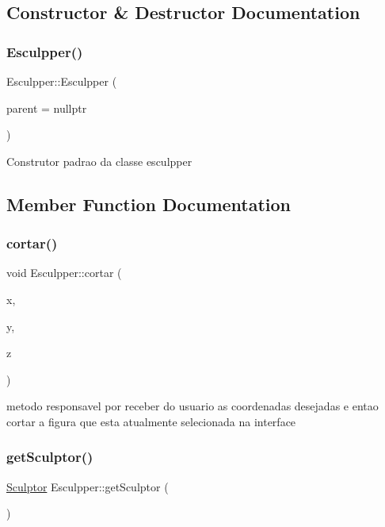 \subsection{Constructor \& Destructor Documentation}
\mbox{\label{class_esculpper_a89d2a33b5b2cebd4b06a938fed3c7d3b}} 
\subsubsection{\texorpdfstring{Esculpper()}{Esculpper()}}
{\footnotesize\ttfamily Esculpper\+::\+Esculpper (\begin{DoxyParamCaption}\item[{Q\+Widget $\ast$}]{parent = {\ttfamily nullptr} }\end{DoxyParamCaption})\hspace{0.3cm}{\ttfamily [explicit]}}

Construtor padrao da classe esculpper 

\subsection{Member Function Documentation}
\mbox{\label{class_esculpper_ae79b3da4d0b21385d56ca89b4584e802}} 
\subsubsection{\texorpdfstring{cortar()}{cortar()}}
{\footnotesize\ttfamily void Esculpper\+::cortar (\begin{DoxyParamCaption}\item[{int}]{x,  }\item[{int}]{y,  }\item[{int}]{z }\end{DoxyParamCaption})}

metodo responsavel por receber do usuario as coordenadas desejadas e entao cortar a figura que esta atualmente selecionada na interface \mbox{\label{class_esculpper_aa28642864781d77f35236e6504ab3ce0}} 
\subsubsection{\texorpdfstring{getSculptor()}{getSculptor()}}
{\footnotesize\ttfamily \mbox{\hyperlink{class_sculptor}{Sculptor}} Esculpper\+::get\+Sculptor (\begin{DoxyParamCaption}{ }\end{DoxyParamCaption})}

